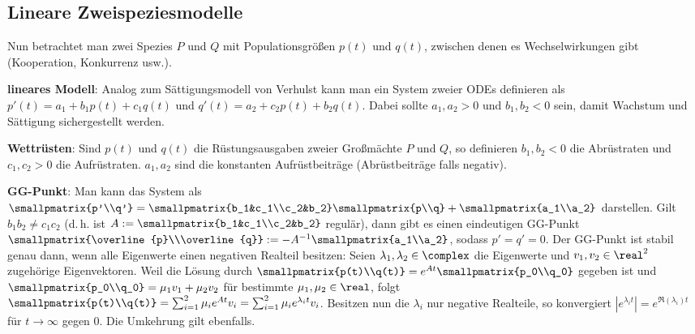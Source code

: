 \pagebreak

\subsection{%
    Lineare Zweispeziesmodelle%
}

Nun betrachtet man zwei Spezies $P$ und $Q$ mit Populationsgrößen $p(t)$ und $q(t)$,
zwischen denen es Wechselwirkungen gibt (Kooperation, Konkurrenz usw.).

\textbf{lineares Modell}:
Analog zum Sättigungsmodell von Verhulst kann man ein System zweier ODEs definieren als
$p'(t) = a_1 + b_1 p(t) + c_1 q(t)$ und $q'(t) = a_2 + c_2 p(t) + b_2 q(t)$.
Dabei sollte $a_1, a_2 > 0$ und $b_1, b_2 < 0$ sein, damit Wachstum und Sättigung sichergestellt
werden.

\linie

\textbf{Wettrüsten}:
Sind $p(t)$ und $q(t)$ die Rüstungsausgaben zweier Großmächte $P$ und $Q$, so definieren
$b_1, b_2 < 0$ die Abrüstraten und $c_1, c_2 > 0$ die Aufrüstraten.
$a_1, a_2$ sind die konstanten Aufrüstbeiträge (Abrüstbeiträge falls negativ).

\textbf{GG-Punkt}:
Man kann das System als
$\smallpmatrix{p'\\q'} = \smallpmatrix{b_1&c_1\\c_2&b_2} \smallpmatrix{p\\q} +
\smallpmatrix{a_1\\a_2}$
darstellen.
Gilt $b_1 b_2 \not= c_1 c_2$ (d.\,h. ist $A := \smallpmatrix{b_1&c_1\\c_2&b_2}$ regulär),
dann gibt es einen eindeutigen GG-Punkt
$\smallpmatrix{\overline{p}\\\overline{q}} := -A^{-1} \smallpmatrix{a_1\\a_2}$,
sodass $p' = q' = 0$.
Der GG-Punkt ist stabil genau dann, wenn alle Eigenwerte einen negativen Realteil besitzen:
Seien $\lambda_1, \lambda_2 \in \complex$ die Eigenwerte und $v_1, v_2 \in \real^2$
zugehörige Eigenvektoren.
Weil die Lösung durch $\smallpmatrix{p(t)\\q(t)} = e^{At} \smallpmatrix{p_0\\q_0}$ gegeben ist
und $\smallpmatrix{p_0\\q_0} = \mu_1 v_1 + \mu_2 v_2$ für bestimmte $\mu_1, \mu_2 \in \real$,
folgt $\smallpmatrix{p(t)\\q(t)} = \sum_{i=1}^2 \mu_i e^{At} v_i
= \sum_{i=1}^2 \mu_i e^{\lambda_i t} v_i$.
Besitzen nun die $\lambda_i$ nur negative Realteile, so konvergiert
$|e^{\lambda_i t}| = e^{\Re(\lambda_i)t}$ für $t \to \infty$ gegen $0$.
Die Umkehrung gilt ebenfalls.

